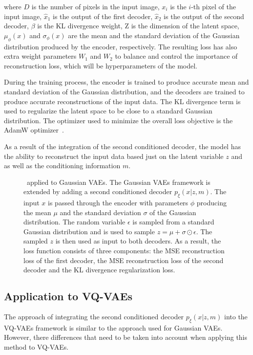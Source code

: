 where $D$ is the number of pixels in the input image, $x_i$ is the $i$-th pixel
of the input image, $\hat{x}_1$ is the output of the first decoder, $\hat{x}_2$
is the output of the second decoder, $\beta$ is the KL divergence weight, Z is
the dimension of the latent space, $\mu_\phi(x)$ and $\sigma_\phi(x)$ are the
mean and the standard deviation of the Gaussian distribution produced by the
encoder, respectively. The resulting loss has also extra weight parameters $W_1$ and $W_2$ to balance and control the importance of reconstruction loss, which will be hyperparameters of the model.

During the training process, the encoder is trained to produce accurate mean
and standard deviation of the Gaussian distribution, and the decoders are
trained to produce accurate reconstructions of the input data. The KL
divergence term is used to regularize the latent space to be close to a
standard Gaussian distribution. The optimizer used to minimize the overall loss
objective is the AdamW optimizer~\cite{AdamW}.

As a result of the integration of the second conditioned decoder, the model has
the ability to reconstruct the input data based just on the latent variable $z$
and as well as the conditioning information $m$.
\begin{figure}[H]
    \centering
    
    \caption[ applied to Gaussian VAEs.]%
    {
        \methodOne\ applied to Gaussian VAEs. The Gaussian VAEs framework is extended by adding a second conditioned decoder $p_\xi(x|z,m)$. The input $x$ is passed through the encoder with parameters $\phi$ producing the mean $\mu$ and the standard deviation $\sigma$ of the Gaussian distribution. The random variable $\epsilon$ is sampled from a standard Gaussian distribution and is used to sample $ z = \mu + \sigma \odot \epsilon$. The sampled $z$ is then used as input to both decoders. As a result, the loss function consists of three components: the MSE reconstruction loss of the first decoder, the MSE reconstruction loss of the second decoder and the KL divergence regularization loss.
    }\label{SCVAE2DFigure}
\end{figure}

\subsection{Application to VQ-VAEs}

The approach of integrating the second conditioned decoder $p_\xi(x|z,m)$ into
the VQ-VAEs framework is similar to the approach used for Gaussian VAEs.
However, there differences that need to be taken into account when applying
this method to VQ-VAEs.

